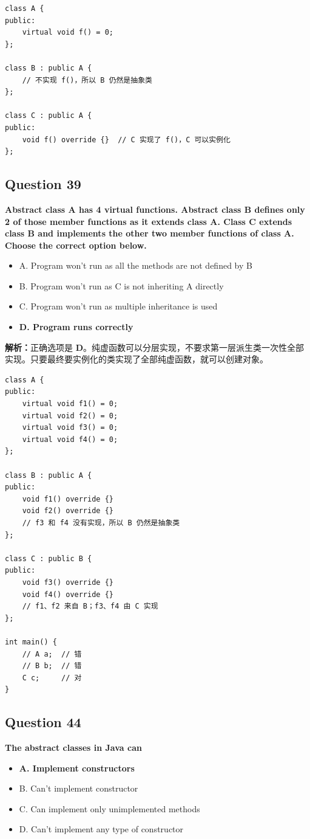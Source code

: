 \documentclass[11pt, a4paper]{article}
\begin{document}
\begin{lstlisting}
class A {
public:
    virtual void f() = 0;
};

class B : public A {
    // 不实现 f()，所以 B 仍然是抽象类
};

class C : public A {
public:
    void f() override {}  // C 实现了 f()，C 可以实例化
};
\end{lstlisting}


\subsection*{Question 39}
\textbf{Abstract class A has 4 virtual functions. Abstract class B defines only 2 of those member functions as it extends class A. Class C extends class B and implements the other two member functions of class A. Choose the correct option below.}
\begin{itemize}
    \item A. Program won’t run as all the methods are not defined by B
    \item B. Program won’t run as C is not inheriting A directly
    \item C. Program won’t run as multiple inheritance is used
    \item \textbf{D. Program runs correctly}
\end{itemize}

\textbf{解析：}正确选项是 \textbf{D}。纯虚函数可以分层实现，不要求第一层派生类一次性全部实现。只要最终要实例化的类实现了全部纯虚函数，就可以创建对象。

\begin{lstlisting}
class A {
public:
    virtual void f1() = 0;
    virtual void f2() = 0;
    virtual void f3() = 0;
    virtual void f4() = 0;
};

class B : public A {
public:
    void f1() override {}
    void f2() override {}
    // f3 和 f4 没有实现，所以 B 仍然是抽象类
};

class C : public B {
public:
    void f3() override {}
    void f4() override {}
    // f1、f2 来自 B；f3、f4 由 C 实现
};

int main() {
    // A a;  // 错
    // B b;  // 错
    C c;     // 对
}
\end{lstlisting}


\subsection*{Question 44}
\textbf{The abstract classes in Java can \underline{\hspace{2cm}}}
\begin{itemize}
    \item \textbf{A. Implement constructors}
    \item B. Can’t implement constructor
    \item C. Can implement only unimplemented methods
    \item D. Can’t implement any type of constructor
\end{itemize}
\end{document}
